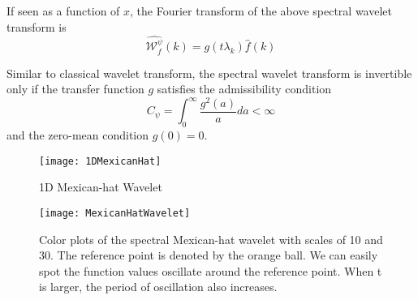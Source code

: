 If seen as a function of $x$, the Fourier transform of the above spectral wavelet transform is
\begin{equation}
\widehat{\mathcal{W}^\psi_f}(k)=g(t\lambda_k)\hat{f}(k)
\end{equation}

Similar to classical wavelet transform, the spectral wavelet transform is invertible only if the transfer function $g$ satisfies the admissibility condition
\begin{equation}
C_\psi=\int_0^\infty\frac{g^2(a)}{a}da<\infty
\end{equation}
and the zero-mean condition $g(0)=0$.



\begin{figure}
  \centering
  \texttt{[image: 1DMexicanHat]}\\
  \caption{1D Mexican-hat Wavelet}
  \label{fg:1DMexicanHat}
\end{figure}

\begin{figure}
  \centering
  \texttt{[image: MexicanHatWavelet]}\\
  \caption[Color plots of the spectral Mexican-hat wavelets.]
  {Color plots of the spectral Mexican-hat wavelet with scales of 10 and 30. The reference point is denoted by the orange ball. We can easily spot the function values oscillate around the reference point. When t is larger, the period of oscillation also increases.}
  \label{fg:MexicanHatWavelet}
\end{figure}

